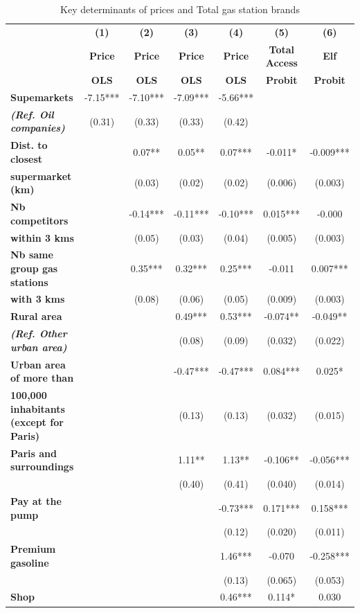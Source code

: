 \documentclass[english]{article}
\begin{document}
\begin{table}[H]
\caption{Key determinants of prices and Total gas station brands}
\label{tab:price_and_total_brand_regs}
\begin{threeparttable}
\begin{footnotesize}
\begin{tabular}{l|cccccc}
\hline
\hline
 & \textbf{(1)}  & \textbf{(2)}  & \textbf{(3)}  & \textbf{(4)}  & \textbf{(5)}  & \textbf{(6)}\tabularnewline
 & \textbf{Price}  & \textbf{Price}  & \textbf{Price}  & \textbf{Price}  & \textbf{Total Access}  & \textbf{Elf}\tabularnewline
 & \textbf{OLS}  & \textbf{OLS}  & \textbf{OLS}  & \textbf{OLS}  & \textbf{Probit}  & \textbf{Probit}\tabularnewline
\hline
\textbf{Supemarkets}  & -7.15{*}{*}{*}  & -7.10{*}{*}{*}  & -7.09{*}{*}{*}  & -5.66{*}{*}{*}  &  & \tabularnewline
\textbf{\textit{(Ref. Oil companies)}}  & (0.31)  & (0.33)  & (0.33)  & (0.42)  &  & \tabularnewline
\hline
\textbf{Dist. to closest}  &  & 0.07{*}{*}  & 0.05{*}{*}  & 0.07{*}{*}{*}  & -0.011{*}  & -0.009{*}{*}{*}\tabularnewline
\textbf{supermarket (km)}  &  & (0.03)  & (0.02)  & (0.02)  & (0.006)  & (0.003)\tabularnewline
\textbf{Nb competitors}  &  & -0.14{*}{*}{*}  & -0.11{*}{*}{*}  & -0.10{*}{*}{*}  & 0.015{*}{*}{*}  & -0.000\tabularnewline
\textbf{within 3 kms}  &  & (0.05)  & (0.03)  & (0.04)  & (0.005)  & (0.003)\tabularnewline
\textbf{Nb same group gas stations}  &  & 0.35{*}{*}{*}  & 0.32{*}{*}{*}  & 0.25{*}{*}{*}  & -0.011  & 0.007{*}{*}{*}\tabularnewline
\textbf{with 3 kms}  &  & (0.08)  & (0.06)  & (0.05)  & (0.009)  & (0.003)\tabularnewline
\hline
\textbf{Rural area}  &  &  & 0.49{*}{*}{*}  & 0.53{*}{*}{*}  & -0.074{*}{*}  & -0.049{*}{*}\tabularnewline
\textbf{\textit{(Ref. Other urban area)}}  &  &  & (0.08)  & (0.09)  & (0.032)  & (0.022)\tabularnewline
\textbf{Urban area of more than}  &  &  & -0.47{*}{*}{*}  & -0.47{*}{*}{*}  & 0.084{*}{*}{*}  & 0.025{*}\tabularnewline
\textbf{100,000 inhabitants (except for Paris)}  &  &  & (0.13)  & (0.13)  & (0.032)  & (0.015)\tabularnewline
\textbf{Paris and surroundings}  &  &  & 1.11{*}{*}  & 1.13{*}{*}  & -0.106{*}{*}  & -0.056{*}{*}{*}\tabularnewline
 &  &  & (0.40)  & (0.41)  & (0.040)  & (0.014)\tabularnewline
\hline
\textbf{Pay at the pump}  &  &  &  & -0.73{*}{*}{*}  & 0.171{*}{*}{*}  & 0.158{*}{*}{*}\tabularnewline
 &  &  &  & (0.12)  & (0.020)  & (0.011)\tabularnewline
\textbf{Premium gasoline}  &  &  &  & 1.46{*}{*}{*}  & -0.070  & -0.258{*}{*}{*}\tabularnewline
 &  &  &  & (0.13)  & (0.065)  & (0.053)\tabularnewline
\textbf{Shop}  &  &  &  & 0.46{*}{*}{*}  & 0.114{*}  & 0.030\tabularnewline

\end{tabular}
\end{footnotesize}
\end{threeparttable}
\end{table}
\end{document}

